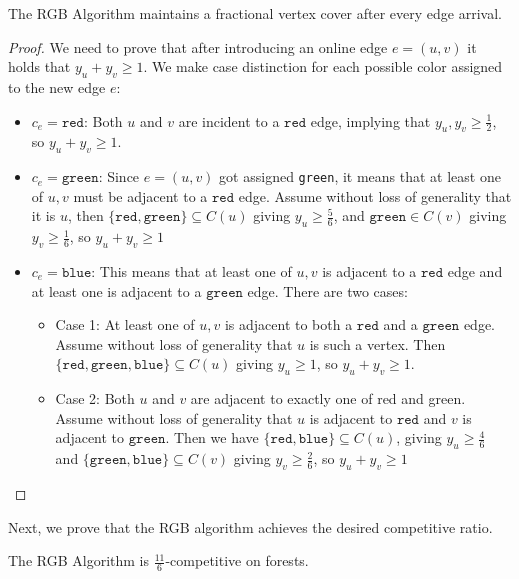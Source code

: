 \documentclass[a4paper,USenglish,cleveref,autoref,thm-restate,pdfa]{lipics-v2021}
\let\geq\geqslant
\newcommand{\cred}{\texttt{red}}
\newcommand{\cblue}{\texttt{blue}}
\newcommand{\cgreen}{\texttt{green}}
\begin{document}
\begin{lemma}
  The RGB Algorithm maintains a fractional vertex cover after every edge arrival.
\end{lemma}
\begin{proof}
  We need to prove that after introducing an online edge $e = (u,v)$ it holds that $y_u + y_v \geq 1$. We make case distinction for each possible color assigned to the new edge $e$:

\begin{itemize}
  \item $c_e = \cred$: Both $u$ and $v$ are incident to a $\cred$ edge, implying that $y_u, y_v \geq \frac{1}{2} $, so $ y_u + y_v \geq 1$.
    
  \item $c_e = \cgreen$: Since $e = (u, v)$ got assigned \cgreen, it means that at least one of $u, v$ must be adjacent to a $\cred$ edge. Assume without loss of generality that it is $u$, then $\{\cred, \cgreen\} \subseteq C(u)$ giving $y_u \geq \frac{5}{6}$, and $\cgreen \in C(v)$ giving $y_v \geq \frac{1}{6}$, so $ y_u + y_v \geq 1$
    
  \item $c_e = \cblue$: This means that at least one of $u, v$ is adjacent to a $\cred$ edge and at least one is adjacent to a $\cgreen$ edge.
    There are two cases:
    \begin{itemize}
      \item Case 1: At least one of $u, v$ is adjacent to both a $\cred$ and a $\cgreen$ edge. Assume without loss of generality that $u$ is such a vertex. Then $\{\cred, \cgreen, \cblue\} \subseteq C(u)$ giving $y_u \geq 1$, so $ y_u + y_v \geq 1$.
      \item Case 2: Both $u$ and  $v$ are adjacent to exactly one of red and green. Assume without loss of generality that $u$ is adjacent to $\cred$ and $v$ is adjacent to $\cgreen$. Then we have $\{\cred, \cblue\} \subseteq C(u)$, giving $y_u \geq \frac{4}{6}$ and $\{\cgreen, \cblue\} \subseteq C(v)$ giving $y_v \geq \frac{2}{6}$, so $ y_u + y_v \geq 1$
    \end{itemize}


\end{itemize}

\end{proof}

Next, we prove that the RGB algorithm achieves the desired competitive ratio.

\begin{theorem}
  The RGB Algorithm is $\frac{11}{6}$-competitive on forests.
\end{theorem}
\end{document}
